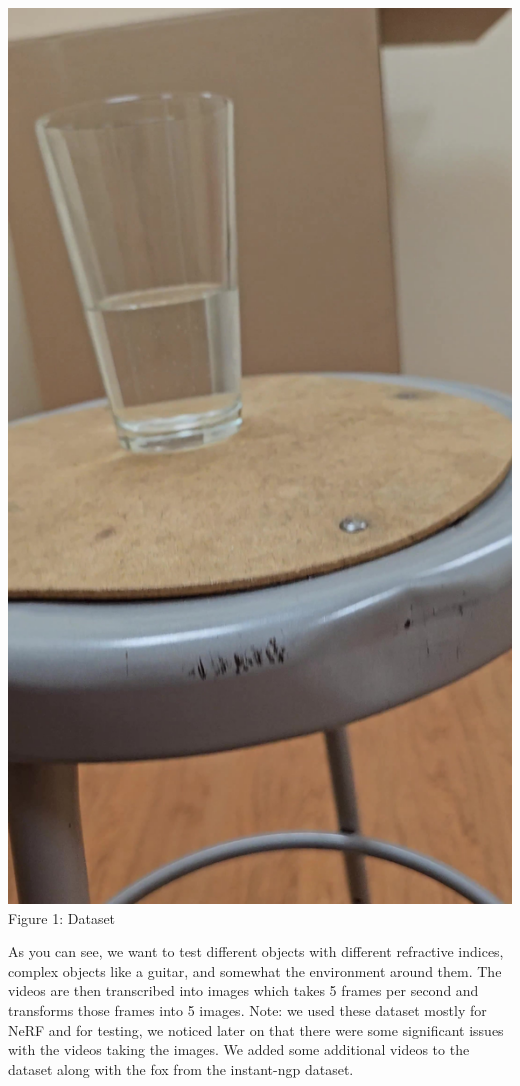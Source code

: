 \documentclass{article}
\begin{document}
\begin{center}
    \includegraphics[scale=0.02]{images/water3.jpg}\\
    Figure 1: Dataset
\end{center}

As you can see, we want to test different objects with different refractive indices, complex objects like a guitar, and somewhat the environment around them. The videos are then transcribed into images which takes 5 frames per second and transforms those frames into 5 images. Note: we used these dataset mostly for NeRF and for testing, we noticed later on that there were some significant issues with the videos taking the images. We added some additional videos to the dataset along with the fox from the instant-ngp dataset.
\end{document}
